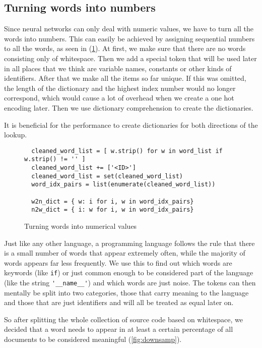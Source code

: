  \subsection{Turning words into numbers}
  \label{sub:turning_words_into_numbers}
  
    Since neural networks can only deal with numeric values, we have to turn all the words into numbers.
    This can easily be achieved by assigning sequential numbers to all the words, as seen in (\ref{fig:tonums}).
    At first, we make sure that there are no words consisting only of whitespace. Then we add a special token
    that will be used later in all places that we think are variable names, constants or other kinds
    of identifiers. After that we make all the items so far unique. If this was omitted, the length of the dictionary
    and the highest index number would no longer correspond, which would cause a lot of overhead when we
    create a one hot encoding later. Then we use dictionary comprehension to create the dictionaries.

    It is beneficial for the performance to create dictionaries for both directions of the lookup.

    \begin{figure}[htpb]
      \centering
      \begin{lstlisting}
  cleaned_word_list = [ w.strip() for w in word_list if w.strip() != '' ]
  cleaned_word_list += ['<ID>']
  cleaned_word_list = set(cleaned_word_list)
  word_idx_pairs = list(enumerate(cleaned_word_list))

  w2n_dict = { w: i for i, w in word_idx_pairs}
  n2w_dict = { i: w for i, w in word_idx_pairs} \end{lstlisting}
      \caption{Turning words into numerical values}
      \label{fig:tonums}
    \end{figure}

    Just like any other language, a programming language follows the rule that there is a small number of words that
    appear extremely often, while the majority of words appears far less frequently. We use this to
    find out which words are keywords (like \verb+if+) or just common enough to be considered part of the language
    (like the string \verb+'__name__'+) and which words are just noise. The tokens can then mentally be split into
    two categories, those that carry meaning to the language and those that are just identifiers and will all be treated
    as equal later on.
  
    So after splitting the whole collection of source code based on whitespace, we decided that a word needs to appear
    in at least a certain percentage of all documents to be considered meaningful (\ref{fig:downsamp}).

